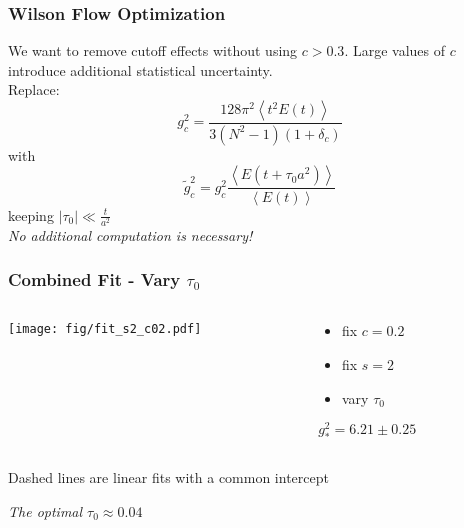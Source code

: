 \begin{frame}
  \frametitle{Wilson Flow Optimization}
  We want to remove cutoff effects without using $c>0.3$. Large values of $c$ introduce additional statistical uncertainty.\\
  \vspace{12pt}
  Replace:
  \begin{equation*}
    g_c^2=\frac{128\pi^2\left<t^2E(t)\right>}{3(N^2-1)(1+\delta_c)}
  \end{equation*}
  with
  \begin{equation*}
    \widetilde{g}_c^2=g_c^2\frac{\left<E(t+\tau_0a^2)\right>}{\left<E(t)\right>}
  \end{equation*}
  keeping $|\tau_0|\ll \frac{t}{a^2}$\\
  \vspace{12pt}
  \emph{No additional computation is necessary!}
\end{frame}

\begin{frame}
  \frametitle{Combined Fit - Vary $\tau_0$}
  \begin{columns}[T]
    \begin{column}{.7\textwidth}
      \texttt{[image: fig/fit\_s2\_c02.pdf]}
    \end{column}
    \begin{column}{.3\textwidth}
      \begin{itemize}
        \item fix $c=0.2$
        \item fix $s=2$
        \item vary $\tau_0$
      \end{itemize}
      \vspace{24pt}
      $g^2_*=6.21\pm0.25$
    \end{column}
  \end{columns}
  \vspace{12pt}
  Dashed lines are linear fits with a common intercept\\
  \begin{center}\emph{The optimal $\tau_0\approx0.04$}\end{center}
\end{frame}

